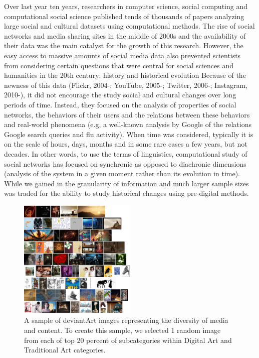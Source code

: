 \documentclass[letterpaper]{article}
\begin{document}
\noindent Over last year ten years, researchers in computer science, social computing and computational social science published tends of thousands of papers analyzing large social and cultural datasets using computational methods. The rise of social networks and media sharing sites in the middle of 2000s and the availability of their data  was the main catalyst for the growth of this research. However, the easy access to massive amounts of social media data also prevented scientists from considering certain questions that were central for social sciences and humanities in the 20th century: history and historical evolution Because of the newness of this data (Flickr, 2004-; YouTube, 2005-; Twitter, 2006-; Instagram, 2010-), it did not encourage the study social and cultural changes over long periods of time. Instead, they focused on the analysis of properties of social networks, the behaviors of their users and the relations between these behaviors and real-world phenomena (e.g, a well-known analysis by Google of the relations Google search queries and flu activity). When time was considered, typically it is on the scale of hours, days, months and in some rare cases a few years, but not decades. In other words, to use the terms of linguistics, computational study of social networks has focused on synchronic as opposed to diachronic dimensions (analysis of the system in a given moment rather than its evolution in time). While we gained in the granularity of information and much larger sample sizes was traded for the ability to study historical changes using pre-digital methods. 


\begin{figure}[h!]
    \includegraphics[width=0.5\textwidth]{top_20_percent_cats_1_images_each}
  \caption{A sample of deviantArt images representing the diversity of media and content. To create this sample, we selected 1 random image from each of top 20 percent of subcategories within Digital Art and Traditional Art categories.}
\end{figure}
\end{document}
